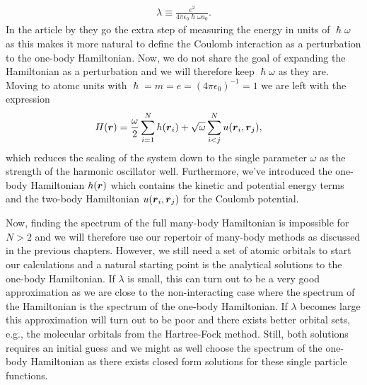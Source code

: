         \begin{align}
            \lambda \equiv \frac{e^2}{
                4\pi \epsilon_0 \hslash \omega a_0
            }.
            \label{eq:two-dim-ho-lambda}
        \end{align}
        In the article by \citeauthor{anisimovas1998energy}
        \cite{anisimovas1998energy} they go the extra step of measuring the
        energy in units of $\hslash\omega$ as this makes it more natural to
        define the Coulomb interaction as a perturbation to the one-body
        Hamiltonian.
        Now, we do not share the goal of expanding the Hamiltonian as a
        perturbation and we will therefore keep $\hslash\omega$ as they are.
        Moving to atomc units with $\hslash = m = e = (4\pi \epsilon_0)^{-1} =
        1$ we are left with the expression
        \begin{align}
            H(\boldsymbol{r})
            &= \frac{\omega}{2} \sum_{i = 1}^{N}
            h(\boldsymbol{r}_i)
            + \sqrt{\omega} \sum_{i < j}^{N} u(\boldsymbol{r}_i, \boldsymbol{r}_j),
            \label{eq:tdho-hamiltonian}
        \end{align}
        which reduces the scaling of the system down to the single parameter
        $\omega$ as the strength of the harmonic oscillator well.
        Furthermore, we've introduced the one-body Hamiltonian
        $h(\boldsymbol{r})$ which contains the kinetic and potential energy terms
        and the two-body Hamiltonian $u(\boldsymbol{r}_i, \boldsymbol{r}_j)$ for the
        Coulomb potential.

        Now, finding the spectrum of the full many-body Hamiltonian is
        impossible for $N > 2$ and we will therefore use our repertoir of
        many-body methods as discussed in the previous chapters.
        However, we still need a set of atomic orbitals to start our
        calculations and a natural starting point is the analytical solutions to
        the one-body Hamiltonian.
        If $\lambda$ is small, this can turn out to be a very good approximation
        as we are close to the non-interacting case where the spectrum of the
        Hamiltonian is the spectrum of the one-body Hamiltonian.
        If $\lambda$ becomes large this approximation will turn out to be poor
        and there exists better orbital sets, e.g., the molecular orbitals from
        the Hartree-Fock method.
        Still, both solutions requires an initial guess and we might as well
        choose the spectrum of the one-body Hamiltonian as there exists closed
        form solutions for these single particle functions.


